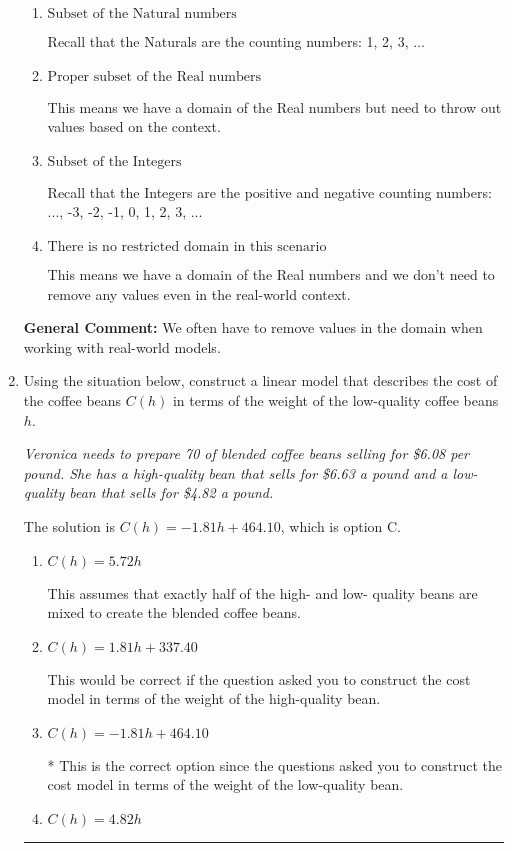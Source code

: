 \documentclass{extbook}[14pt]
\newcommand{\litem}[1]{\item #1

\rule{\textwidth}{0.4pt}}
\begin{document}
\begin{enumerate}
{\begin{enumerate}[label=\Alph*.]
Recall that the Rationals are fractions with Integers in the numerator and denominator.
\item \( \text{Subset of the Natural numbers} \)

Recall that the Naturals are the counting numbers: 1, 2, 3, ...
\item \( \text{Proper subset of the Real numbers} \)

This means we have a domain of the Real numbers but need to throw out values based on the context.
\item \( \text{Subset of the Integers} \)

Recall that the Integers are the positive and negative counting numbers: ..., -3, -2, -1, 0, 1, 2, 3, ... 
\item \( \text{There is no restricted domain in this scenario} \)

This means we have a domain of the Real numbers and we don't need to remove any values even in the real-world context.
\end{enumerate}

\textbf{General Comment:} We often have to remove values in the domain when working with real-world models.
}
\litem{
Using the situation below, construct a linear model that describes the cost of the coffee beans $C(h)$ in terms of the weight of the low-quality coffee beans $h$.

\begin{center}
    \textit{ Veronica needs to prepare 70 of blended coffee beans selling for \$6.08 per pound. She has a high-quality bean that sells for \$6.63 a pound and a low-quality bean that sells for \$4.82 a pound. }
\end{center}
The solution is \( C(h) = -1.81 h + 464.10 \), which is option C.\begin{enumerate}[label=\Alph*.]
\item \( C(h) = 5.72 h \)

This assumes that exactly half of the high- and low- quality beans are mixed to create the blended coffee beans.
\item \( C(h) = 1.81 h + 337.40 \)

This would be correct if the question asked you to construct the cost model in terms of the weight of the high-quality bean.
\item \( C(h) = -1.81 h + 464.10 \)

* This is the correct option since the questions asked you to construct the cost model in terms of the weight of the low-quality bean.
\item \( C(h) = 4.82 h \)


\end{enumerate}}
\end{enumerate}
\end{document}

